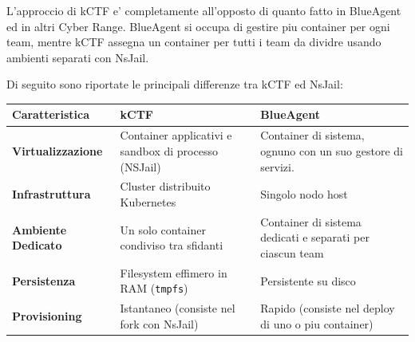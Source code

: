 L'approccio di kCTF e' completamente all'opposto di quanto fatto in
BlueAgent ed in altri Cyber Range. BlueAgent si occupa di gestire piu
container per ogni team, mentre kCTF assegna un container per tutti i
team da dividre usando ambienti separati con NsJail.

Di seguito sono riportate le principali differenze tra kCTF ed NsJail:

{\def\LTcaptype{none} %
\begin{longtable}[]{@{}
  >{\raggedright\arraybackslash}p{}
  >{\raggedright\arraybackslash}p{}
  >{\raggedright\arraybackslash}p{}@{}}
\toprule\noalign{}
\begin{minipage}[b]{\linewidth}\raggedright
Caratteristica
\end{minipage} & \begin{minipage}[b]{\linewidth}\raggedright
kCTF
\end{minipage} & \begin{minipage}[b]{\linewidth}\raggedright
BlueAgent
\end{minipage} \\
\midrule\noalign{}
\endhead
\bottomrule\noalign{}
\endlastfoot
\textbf{Virtualizzazione} & Container applicativi e sandbox di processo
(NSJail) & Container di sistema, ognuno con un suo gestore di
servizi. \\
\textbf{Infrastruttura} & Cluster distribuito Kubernetes & Singolo nodo
host \\
\textbf{Ambiente Dedicato } & Un solo container condiviso tra sfidanti &
Container di sistema dedicati e separati per ciascun team \\
\textbf{Persistenza} & Filesystem effimero in RAM
(\passthrough{\lstinline!tmpfs!}) & Persistente su disco \\
\textbf{Provisioning} & Istantaneo (consiste nel fork con NsJail) &
Rapido (consiste nel deploy di uno o piu container) \\
\end{longtable}
}
